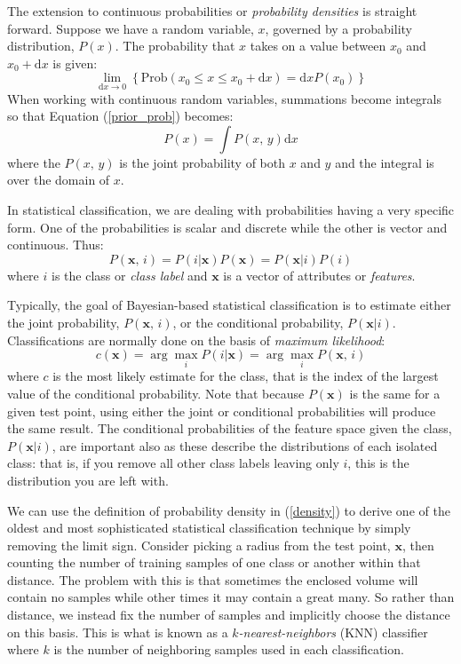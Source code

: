 \documentclass{article}
\renewcommand{\vec}[1]{\boldsymbol{#1}}
\begin{document}
The extension to continuous probabilities or {\it probability densities} is
straight forward.
Suppose we have a random variable, $x$, governed by a probability distribution,
$P(x)$.
The probability that $x$ takes on a value between $x_0$ and $x_0+\mathrm d x$ is
given:
\begin{equation}
	\lim_{\mathrm d x \rightarrow 0} \left \lbrace \mathrm{Prob}(x_0 \le x \le x_0+\mathrm d x) = \mathrm d x P(x_0) \right \rbrace
	\label{density}
\end{equation}
When working with continuous random variables, summations become integrals
so that Equation (\ref{prior_prob}) becomes:
\begin{equation}
	P(x) = \int P(x,\, y) \mathrm d x
\end{equation}
where the $P(x,\,y)$ is the joint probability of both $x$ and $y$ and the 
integral is over the domain of $x$.

In statistical classification, we are dealing with probabilities
having a very specific form.
One of the probabilities is scalar and discrete while the other is vector
and continuous. Thus:
\begin{equation}
	P(\vec x, \, i) = P (i|\vec x) P(\vec x) = P(\vec x|i) P(i)
\end{equation}
where $i$ is the class or {\it class label} and $\vec x$ is a vector of 
attributes or {\it features}.

Typically, the goal of Bayesian-based statistical classification is to
estimate either the joint probability, $P(\vec x, \, i)$, or the conditional
probability, $P(\vec x| i)$.
Classifications are normally done on the basis of {\it maximum likelihood}:
\begin{equation}
	c (\vec x) = \arg \max_i P(i|\vec x) = \arg \max_i P(\vec x,\, i)
\end{equation}
where $c$ is the most likely estimate for the class, that is the index
of the largest value of the conditional probability.
Note that because $P(\vec x)$ is the same for a given test point, using
either the joint or conditional probabilities will produce the same result.
The conditional probabilities of the feature space given the class, 
$P(\vec x|i)$, are important also as these 
describe the distributions of each isolated class: that is, if you remove all 
other class labels leaving only $i$, this is the distribution you are left with.

We can use the definition of probability density in (\ref{density}) to derive one of the oldest and
most sophisticated statistical classification technique by simply removing
the limit sign.
Consider picking a radius from the test point, $\vec x$, then
counting the number of training samples of one class or another within
that distance.
The problem with this is that sometimes the enclosed volume will contain 
no samples while other times it may contain a great many.
So rather than distance, we instead fix the number of samples and implicitly
choose the distance on this basis.
This is what is known as a {\it $k$-nearest-neighbors} (KNN) classifier where $k$
is the number of neighboring samples used in each classification.
\end{document}
